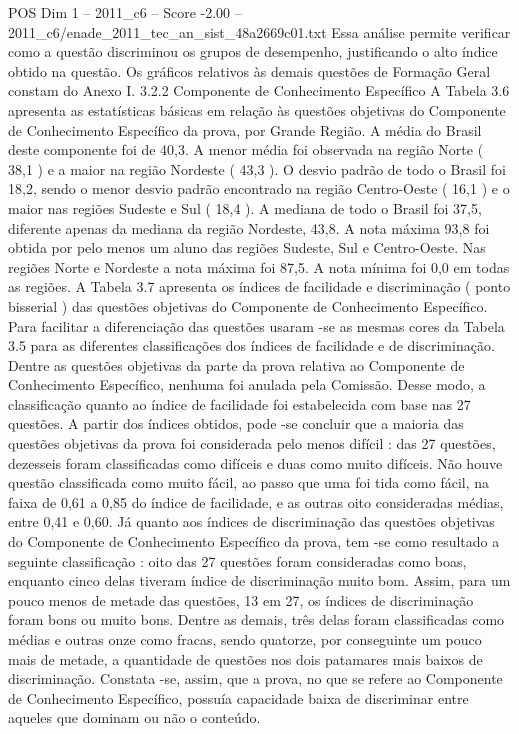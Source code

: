 \begin{textsample}{POS Dim 1 – 2011\_c6 – Score -2.00 – 2011\_c6/enade\_2011\_tec\_an\_sist\_48a2669c01.txt}
Essa análise permite verificar como a questão discriminou os grupos de desempenho, justificando o alto índice obtido na questão.
Os gráficos relativos às demais questões de Formação Geral constam do Anexo I. 3.2.2 Componente de Conhecimento Específico A Tabela 3.6 apresenta as estatísticas básicas em relação às questões objetivas do Componente de Conhecimento Específico da prova, por Grande Região.
A média do Brasil deste componente foi de 40,3.
A menor média foi observada na região Norte ( 38,1 ) e a maior na região Nordeste ( 43,3 ).
O desvio padrão de todo o Brasil foi 18,2, sendo o menor desvio padrão encontrado na região Centro-Oeste ( 16,1 ) e o maior nas regiões Sudeste e Sul ( 18,4 ).
A mediana de todo o Brasil foi 37,5, diferente apenas da mediana da região Nordeste, 43,8.
A nota máxima 93,8 foi obtida por pelo menos um aluno das regiões Sudeste, Sul e Centro-Oeste.
Nas regiões Norte e Nordeste a nota máxima foi 87,5.
A nota mínima foi 0,0 em todas as regiões.
A Tabela 3.7 apresenta os índices de facilidade e discriminação ( ponto bisserial ) das questões objetivas do Componente de Conhecimento Específico.
Para facilitar a diferenciação das questões usaram -se as mesmas cores da Tabela 3.5 para as diferentes classificações dos índices de facilidade e de discriminação.
Dentre as questões objetivas da parte da prova relativa ao Componente de Conhecimento Específico, nenhuma foi anulada pela Comissão.
Desse modo, a classificação quanto ao índice de facilidade foi estabelecida com base nas 27 questões.
A partir dos índices obtidos, pode -se concluir que a maioria das questões objetivas da prova foi considerada pelo menos difícil : das 27 questões, dezesseis foram classificadas como difíceis e duas como muito difíceis.
Não houve questão classificada como muito fácil, ao passo que uma foi tida como fácil, na faixa de 0,61 a 0,85 do índice de facilidade, e as outras oito consideradas médias, entre 0,41 e 0,60.
Já quanto aos índices de discriminação das questões objetivas do Componente de Conhecimento Específico da prova, tem -se como resultado a seguinte classificação : oito das 27 questões foram consideradas como boas, enquanto cinco delas tiveram índice de discriminação muito bom.
Assim, para um pouco menos de metade das questões, 13 em 27, os índices de discriminação foram bons ou muito bons.
Dentre as demais, três delas foram classificadas como médias e outras onze como fracas, sendo quatorze, por conseguinte um pouco mais de metade, a quantidade de questões nos dois patamares mais baixos de discriminação.
Constata -se, assim, que a prova, no que se refere ao Componente de Conhecimento Específico, possuía capacidade baixa de discriminar entre aqueles que dominam ou não o conteúdo.

\end{textsample}
